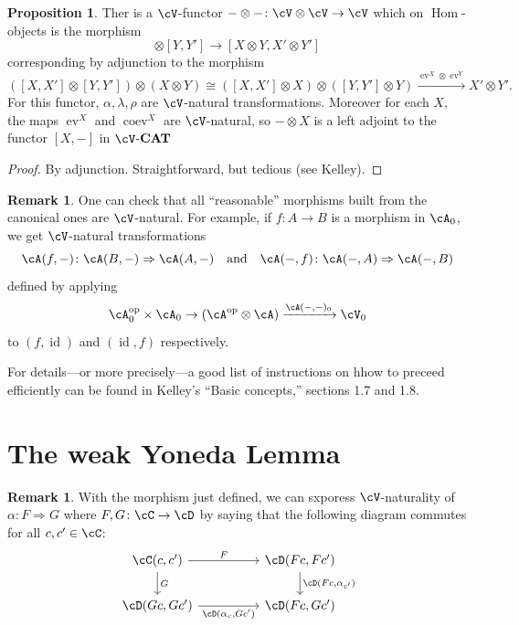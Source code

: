 \documentclass[a4paper,11pt,oneside,openany]{scrbook}
\newcommand{\catname}[1]{{\normalfont\textbf{#1}}}
\newcommand{\CAT}{\catname{CAT}}
\newcommand{\from}{\colon}
\newcommand{\iso}{\cong}
\DeclareMathOperator{\Hom}{\text{Hom}}
\DeclareMathOperator{\op}{\text{op}}
\DeclareMathOperator{\id}{id}
\DeclareMathOperator{\coev}{coev}
\DeclareMathOperator{\ev}{ev}
\theoremstyle{definition}
\theoremstyle{definition}
\newtheorem{prop}[thm]{Proposition}
\newtheorem{rmk}[thm]{Remark}
\begin{document}
\begin{prop}
    Ther is a $ \cV $-functor $ -\otimes -\from \cV \otimes \cV \to \cV $ which on $ \Hom $-objects is the morphism
    \begin{displaymath}
        [X,X']\otimes [Y,Y'] \to [X\otimes Y , X'\otimes Y']
    \end{displaymath}
    corresponding by adjunction to the morphism
    \begin{displaymath}
        ([X,X']\otimes[Y,Y']) \otimes (X\otimes Y)\iso ([X,X']\otimes X)\otimes ([Y,Y']\otimes Y) \xrightarrow{\ev^X \otimes \ev^Y} X'\otimes Y'.
    \end{displaymath}
    For this functor, $ \alpha,\lambda,\rho $ are $ \cV $-natural transformations. Moreover for each $ X $, the maps $ \ev^X $ and $ \coev^X $ are $ \cV $-natural, so $ -\otimes X $ is a left adjoint to the functor $ [X,-] $ in $ \cV $-$\CAT$
\end{prop}
\begin{proof}
    By adjunction. Straightforward, but tedious (see Kelley).
\end{proof}
\begin{rmk}
    One can check that all ``reasonable'' morphisms built from the canonical ones are $ \cV $-natural.
    For example, if $ f \from A \to B $ is a morphism in $ \cA_0 $, we get $ \cV $-natural transformations 
    \begin{displaymath}
        \cA(f,-) \from \cA(B,-)\Rightarrow \cA(A,-) \quad \text{and} \quad  \cA(-,f) \from \cA(-,A) \Rightarrow \cA(-,B) 
    \end{displaymath}defined by applying
    \begin{displaymath}
        \cA_0^{\op}\times \cA_0 \to (\cA^{\op} \otimes \cA) \xrightarrow{\cA(-,-)_0} \cV_0
    \end{displaymath}
    to $ (f,\id) $ and $ (\id,f) $ respectively.
    
    For details---or more precisely---a good list of instructions on hhow to preceed efficiently can be found in Kelley's ``Basic concepts,'' sections 1.7 and 1.8.
\end{rmk}


\section{The weak Yoneda Lemma}

\begin{rmk}
    With the morphism just defined, we can sxporess $ \cV $-naturality of $ \alpha \from F \Rightarrow G $ where $ F,G\from \cC \to \cD $ by saying that the following diagram commutes for all $ c,c' \in \cC $:
    \begin{displaymath}
	\begin{tikzcd}[column sep = huge]
	    \cC(c,c') \arrow[r, "F"]\arrow[d, "G"]& \cD(Fc, Fc')\arrow[d, "{\cD(Fc,\alpha_{c'})}"] \\
	    \cD(Gc,Gc') \arrow[r, "{\cD(\alpha_c, Gc')}"' ]& \cD(Fc,Gc')
        \end{tikzcd}
    \end{displaymath}
\end{rmk}
\end{document}
